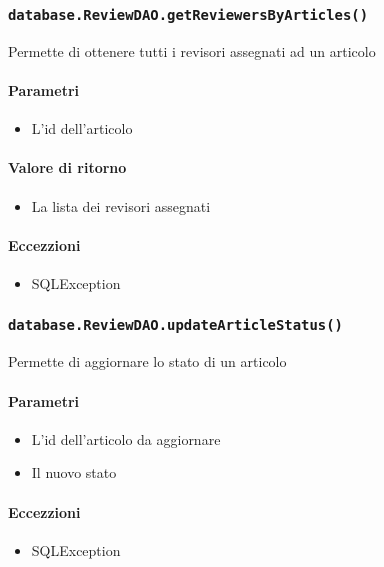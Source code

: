 \subsubsection{\texttt{database.ReviewDAO.getReviewersByArticles()}}
Permette di ottenere tutti i revisori assegnati ad un articolo
\paragraph{Parametri}
\begin{itemize}
\item L'id dell'articolo
\end{itemize}
\paragraph{Valore di ritorno}
\begin{itemize}
\item La lista dei revisori assegnati
\end{itemize}
\paragraph{Eccezzioni}
\begin{itemize}
  \item SQLException
\end{itemize}

\subsubsection{\texttt{database.ReviewDAO.updateArticleStatus()}}
Permette di aggiornare lo stato di un articolo
\paragraph{Parametri}
\begin{itemize}
\item L'id dell'articolo da aggiornare
\item Il nuovo stato
\end{itemize}
\paragraph{Eccezzioni}
\begin{itemize}
  \item SQLException
\end{itemize}

